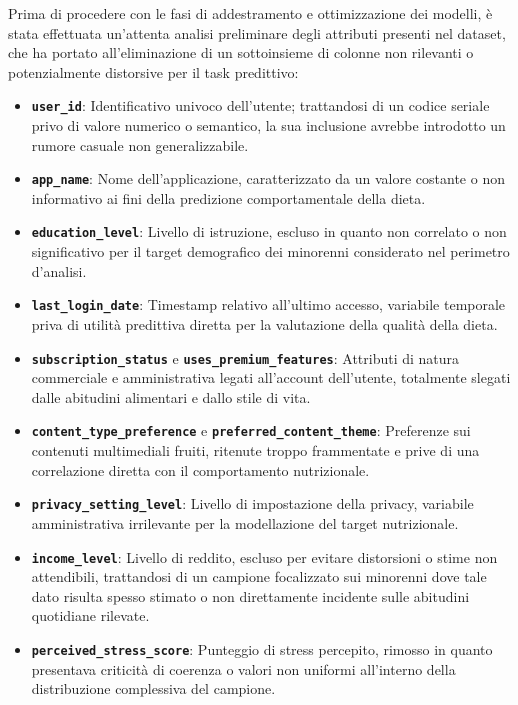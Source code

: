 Prima di procedere con le fasi di addestramento e ottimizzazione dei modelli, è stata effettuata un'attenta analisi preliminare degli attributi presenti nel dataset, che ha portato all'eliminazione di un sottoinsieme di colonne non rilevanti o potenzialmente distorsive per il task predittivo:

\begin{itemize}
    \item \textbf{\texttt{user\_id}}: Identificativo univoco dell'utente; trattandosi di un codice seriale privo di valore numerico o semantico, la sua inclusione avrebbe introdotto un rumore casuale non generalizzabile.
    \item \textbf{\texttt{app\_name}}: Nome dell'applicazione, caratterizzato da un valore costante o non informativo ai fini della predizione comportamentale della dieta.
    \item \textbf{\texttt{education\_level}}: Livello di istruzione, escluso in quanto non correlato o non significativo per il target demografico dei minorenni considerato nel perimetro d'analisi.
    \item \textbf{\texttt{last\_login\_date}}: Timestamp relativo all'ultimo accesso, variabile temporale priva di utilità predittiva diretta per la valutazione della qualità della dieta.
    \item \textbf{\texttt{subscription\_status}} e \textbf{\texttt{uses\_premium\_features}}: Attributi di natura commerciale e amministrativa legati all'account dell'utente, totalmente slegati dalle abitudini alimentari e dallo stile di vita.
    \item \textbf{\texttt{content\_type\_preference}} e \textbf{\texttt{preferred\_content\_theme}}: Preferenze sui contenuti multimediali fruiti, ritenute troppo frammentate e prive di una correlazione diretta con il comportamento nutrizionale.
    \item \textbf{\texttt{privacy\_setting\_level}}: Livello di impostazione della privacy, variabile amministrativa irrilevante per la modellazione del target nutrizionale.
    \item \textbf{\texttt{income\_level}}: Livello di reddito, escluso per evitare distorsioni o stime non attendibili, trattandosi di un campione focalizzato sui minorenni dove tale dato risulta spesso stimato o non direttamente incidente sulle abitudini quotidiane rilevate.
    \item \textbf{\texttt{perceived\_stress\_score}}: Punteggio di stress percepito, rimosso in quanto presentava criticità di coerenza o valori non uniformi all'interno della distribuzione complessiva del campione.
\end{itemize}

